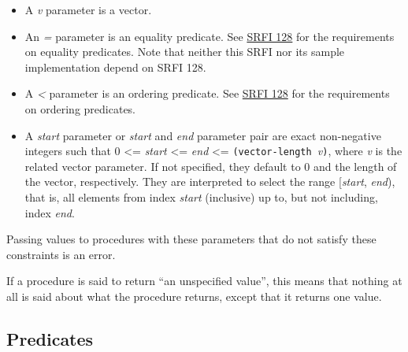 \begin{itemize}
\tightlist
\item
  A \emph{v} parameter is a vector.
\end{itemize}

\begin{itemize}
\tightlist
\item
  An \emph{=} parameter is an equality predicate. See
  \href{http://srfi.schemers.org/srfi-128/srfi-128.html}{SRFI 128} for
  the requirements on equality predicates. Note that neither this SRFI
  nor its sample implementation depend on SRFI 128.
\end{itemize}

\begin{itemize}
\tightlist
\item
  A \emph{\textless{}} parameter is an ordering predicate. See
  \href{http://srfi.schemers.org/srfi-128/srfi-128.html}{SRFI 128} for
  the requirements on ordering predicates. 

\end{itemize}

\begin{itemize}
\tightlist
\item
  A \emph{start} parameter or \emph{start} and \emph{end} parameter pair
  are exact non-negative integers such that 0 \textless{}= \emph{start}
  \textless{}= \emph{end} \textless{}=
  \texttt{(vector-length\ }\emph{v}\texttt{)}, where \emph{v} is the
  related vector parameter. If not specified, they default to 0 and the
  length of the vector, respectively. They are interpreted to select the
  range {[}\emph{start}, \emph{end}), that is, all elements from index
  \emph{start} (inclusive) up to, but not including, index \emph{end}.
\end{itemize}

Passing values to procedures with these parameters that do not satisfy
these constraints is an error.

If a procedure is said to return ``an unspecified value'', this means
that nothing at all is said about what the procedure returns, except
that it returns one value.

\subsection{Predicates}



